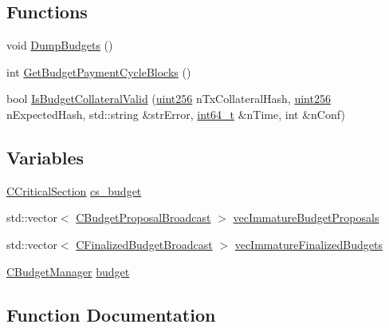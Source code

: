 \subsection*{Functions}
\begin{DoxyCompactItemize}
\item 
void \hyperlink{stormnode-budget_8h_a277f8d83f6cfcfbe4ee3f622d38f8790}{Dump\+Budgets} ()
\item 
int \hyperlink{stormnode-budget_8h_a25f51a3a63c2bdfca39a2c9a7f110ab1}{Get\+Budget\+Payment\+Cycle\+Blocks} ()
\item 
bool \hyperlink{stormnode-budget_8h_af987fefd1417be5dcd356634986dbf83}{Is\+Budget\+Collateral\+Valid} (\hyperlink{classuint256}{uint256} n\+Tx\+Collateral\+Hash, \hyperlink{classuint256}{uint256} n\+Expected\+Hash, std\+::string \&str\+Error, \hyperlink{stdint_8h_adec1df1b8b51cb32b77e5b86fff46471}{int64\+\_\+t} \&n\+Time, int \&n\+Conf)
\end{DoxyCompactItemize}
\subsection*{Variables}
\begin{DoxyCompactItemize}
\item 
\hyperlink{sync_8h_a37a4692b2d517f2843655ca11af7668a}{C\+Critical\+Section} \hyperlink{stormnode-budget_8h_a2343791d00e01ac44a133ed313432d92}{cs\+\_\+budget}
\item 
std\+::vector$<$ \hyperlink{class_c_budget_proposal_broadcast}{C\+Budget\+Proposal\+Broadcast} $>$ \hyperlink{stormnode-budget_8h_ad799c6b69cfbea7cdd37386b6b2a1429}{vec\+Immature\+Budget\+Proposals}
\item 
std\+::vector$<$ \hyperlink{class_c_finalized_budget_broadcast}{C\+Finalized\+Budget\+Broadcast} $>$ \hyperlink{stormnode-budget_8h_adc3baf3c59479fff7d14e28c1496a178}{vec\+Immature\+Finalized\+Budgets}
\item 
\hyperlink{class_c_budget_manager}{C\+Budget\+Manager} \hyperlink{stormnode-budget_8h_ad9842d355854ad5602728a96cf684706}{budget}
\end{DoxyCompactItemize}


\subsection{Function Documentation}
\hypertarget{stormnode-budget_8h_a277f8d83f6cfcfbe4ee3f622d38f8790}{}
